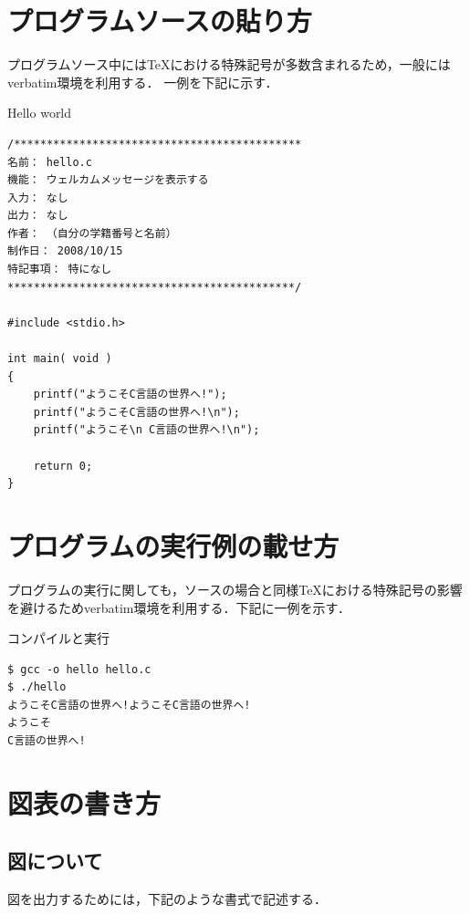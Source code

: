 \documentclass[a4j,titlepage]{jarticle}
\begin{document}
\section{プログラムソースの貼り方}
プログラムソース中には\TeX における特殊記号が多数含まれるため，一般にはverbatim環境を利用する．
一例を下記に示す．

\begin{itembox}[l]{Hello world} \small
\begin{verbatim}
/********************************************
名前： hello.c
機能： ウェルカムメッセージを表示する
入力： なし
出力： なし
作者： （自分の学籍番号と名前）
制作日： 2008/10/15
特記事項： 特になし
********************************************/

#include <stdio.h>

int main( void )
{
    printf("ようこそC言語の世界へ!");
    printf("ようこそC言語の世界へ!\n");
    printf("ようこそ\n C言語の世界へ!\n");
	
    return 0;
}
\end{verbatim}
\end{itembox}

\section{プログラムの実行例の載せ方}
プログラムの実行に関しても，ソースの場合と同様\TeX における特殊記号の影響を避けるためverbatim環境を利用する．下記に一例を示す．

\begin{itembox}[l]{コンパイルと実行}
\begin{verbatim}
$ gcc -o hello hello.c
$ ./hello
ようこそC言語の世界へ!ようこそC言語の世界へ!
ようこそ
C言語の世界へ!
\end{verbatim}
\end{itembox}

\section{図表の書き方}

\subsection{図について}

図を出力するためには，下記のような書式で記述する．
\end{document}
